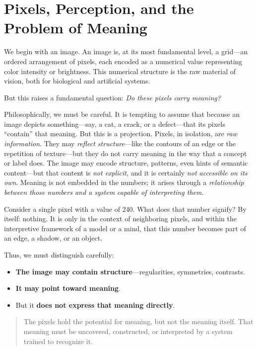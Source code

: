 \section{Pixels, Perception, and the Problem of Meaning}

We begin with an image.  
An image is, at its most fundamental level, a grid—an ordered arrangement of pixels, each encoded as a numerical value representing color intensity or brightness. This numerical structure is the raw material of vision, both for biological and artificial systems.

But this raises a fundamental question:  
\textit{Do these pixels carry meaning?}

Philosophically, we must be careful. It is tempting to assume that because an image depicts something—say, a cat, a crack, or a defect—that its pixels ``contain'' that meaning. But this is a projection. Pixels, in isolation, are \textit{raw information}. They may \textit{reflect structure}—like the contours of an edge or the repetition of texture—but they do not carry meaning in the way that a concept or label does. The image may encode structure, patterns, even hints of semantic content—but that content is \textit{not explicit}, and it is certainly \textit{not accessible on its own}. Meaning is not embedded in the numbers; it arises through a \textit{relationship between those numbers and a system capable of interpreting them}.

Consider a single pixel with a value of 240.  
What does that number signify? By itself: nothing.  
It is only in the context of neighboring pixels, and within the interpretive framework of a model or a mind, that this number becomes part of an edge, a shadow, or an object.

Thus, we must distinguish carefully:
\begin{itemize}
	\item \textbf{The image may contain structure}—regularities, symmetries, contrasts.
	\item \textbf{It may point toward meaning}.
	\item But it \textbf{does not express that meaning directly}.
\end{itemize}

\begin{quote}
	The pixels hold the potential for meaning, but not the meaning itself.  
	That meaning must be uncovered, constructed, or interpreted by a system trained to recognize it.
\end{quote}

